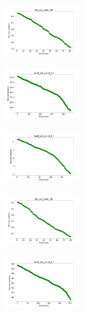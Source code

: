 \newpage

\begin{figure}[H]
    \centering
    \begin{subfigure}
        \centering
        \includegraphics[width=0.32\textwidth]{img/bl/iris_set_const_10_949004259_cost.png}
    \end{subfigure}
    \hfill
    \begin{subfigure}
        \centering
        \includegraphics[width=0.32\textwidth]{img/bl/ecoli_set_const_10_949004259_cost.png}
    \end{subfigure}
    \hfill
    \begin{subfigure}
        \centering
        \includegraphics[width=0.32\textwidth]{img/bl/rand_set_const_10_949004259_cost.png}
    \end{subfigure}
    \hfill
    \begin{subfigure}
        \centering
        \includegraphics[width=0.32\textwidth]{img/bl/iris_set_const_10_589741062_cost.png}
    \end{subfigure}
    \hfill
    \begin{subfigure}
        \centering
        \includegraphics[width=0.32\textwidth]{img/bl/ecoli_set_const_10_589741062_cost.png}

\end{subfigure}
\end{figure}
